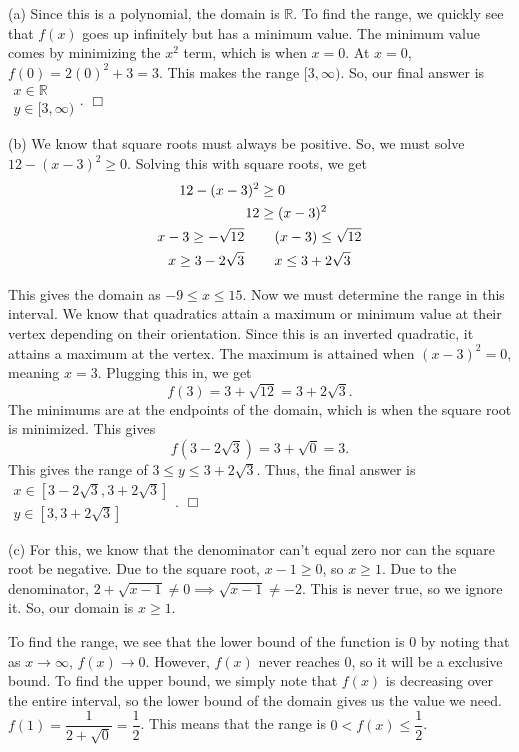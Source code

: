 \documentclass[lang=en,11pt]{elegantbook}
\begin{document}
(a) Since this is a polynomial, the domain is $\mathbb{R}$.  To find the range, we quickly see that $f(x)$ goes up infinitely but has a minimum value.  The minimum value comes by minimizing the $x^2$ term, which is when $x=0$.  At $x=0$, $f(0)=2(0)^2+3=3$.  This makes the range $[3,\infty)$.  So, our final answer is $\boxed{\begin{matrix} x\in\mathbb{R} \\ y\in[3,\infty) \end{matrix}}$. $\Box$

(b) We know that square roots must always be positive.  So, we must solve $12-(x-3)^2 \geq 0$.  Solving this with square roots, we get \begin{align*}
    12-(x-3)^2 &\geq 0 \\ 
    12 &\geq (x-3)^2 \\
    x-3 \geq -\sqrt{12} \hspace{0.15in} & \hspace{0.15in} (x-3) \leq \sqrt{12} \\
    x \geq 3-2\sqrt{3} \hspace{0.15in} & \hspace{0.15in} x \leq 3+2\sqrt{3}
\end{align*}

This gives the domain as $-9 \leq x \leq 15$.  Now we must determine the range in this interval.  We know that quadratics attain a maximum or minimum value at their vertex depending on their orientation.  Since this is an inverted quadratic, it attains a maximum at the vertex.  The maximum is attained when $(x-3)^2=0$, meaning $x=3$.  Plugging this in, we get $$f(3)=3+\sqrt{12}=3+2\sqrt{3}.$$  The minimums are at the endpoints of the domain, which is when the square root is minimized.  This gives $$f\left(3-2\sqrt{3}\right)=3+\sqrt{0}=3.$$  This gives the range of $3\leq y\leq 3+2\sqrt{3}$.  Thus, the final answer is $\boxed{\begin{matrix} x\in\left[3-2\sqrt{3},3+2\sqrt{3}\right] \\ y\in\left[3,3+2\sqrt{3}\right] \end{matrix}}$. $\Box$

(c) For this, we know that the denominator can't equal zero nor can the square root be negative.  Due to the square root, $x-1\geq 0$, so $x\geq 1$.  Due to the denominator, $2+\sqrt{x-1}\neq 0 \implies \sqrt{x-1}\neq -2$.  This is never true, so we ignore it.  So, our domain is $x\geq 1$.  

To find the range, we see that the lower bound of the function is $0$ by noting that as $x\to \infty$, $f(x) \to 0$.  However, $f(x)$ never reaches $0$, so it will be a exclusive bound.  To find the upper bound, we simply note that $f(x)$ is decreasing over the entire interval, so the lower bound of the domain gives us the value we need.  $f(1)=\dfrac{1}{2+\sqrt{0}}=\dfrac{1}{2}$.  This means that the range is $0 < f(x) \leq \dfrac{1}{2}$.  
\end{document}
